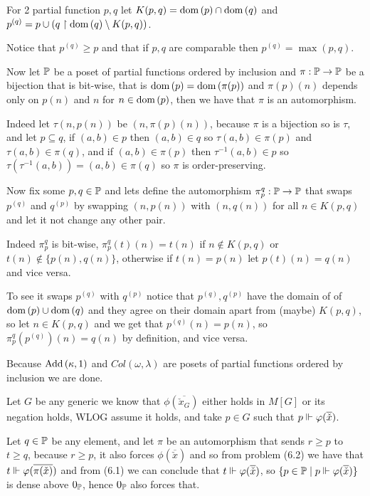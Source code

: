 \begin{cExercise}
	\begin{cPart}
		For 2 partial function $p,q$ let $K(p,q)=\dom{p}\cap \dom{q}$ and $p^{(q)}=p\cup (q\restriction \dom{q}\setminus K(p,q))$.
		
		Notice that $p^{(q)}\ge p$ and that if $p,q$ are comparable then $p^{(q)}=\max(p,q)$.
		
		Now let $\P$ be a poset of partial functions ordered by inclusion and $\pi:\P\to\P$ be a bijection that is bit-wise, that is $\dom{p}=\dom{\pi(p)}$ and $\pi(p)(n)$ depends only on $p(n)$ and $n$ for $n\in\dom{p}$, then we have that $\pi$ is an automorphism.
		
		Indeed let $\tau(n,p(n))$ be $(n,\pi(p)(n))$, because $\pi$ is a bijection so is $\tau$, and let $p\subseteq q$, if $(a,b)\in p$ then $(a,b)\in q$ so $\tau(a,b)\in \pi(p)$ and $\tau(a,b)\in \pi(q)$, and if $(a,b)\in \pi(p)$ then $\tau^{-1}(a,b)\in p$ so $\tau(\tau^{-1}(a,b))=(a,b)\in \pi(q)$ so $\pi$ is order-preserving.
		
		Now fix some $p,q\in\P$ and lets define the automorphism $\pi_p^q:\P\to\P$ that swaps $p^{(q)}$ and $q^{(p)}$ by swapping $(n,p(n))$ with $(n,q(n))$ for all $n\in K(p,q)$ and let it not change any other pair.
		
		Indeed $\pi_p^q$ is bit-wise, $\pi_p^q(t)(n)=t(n)$ if $n\notin K(p,q)$ or $t(n)\notin\{p(n),q(n)\}$, otherwise if $t(n)=p(n)$ let $p(t)(n)=q(n)$ and vice versa.
		
		To see it swaps $p^{(q)}$ with $q^{(p)}$ notice that $p^{(q)},q^{(p)}$ have the domain of of $\dom{p}\cup\dom{q}$ and they agree on their domain apart from (maybe) $K(p,q)$, so let $n\in K(p,q)$ and we get that $p^{(q)}(n)=p(n)$, so $\pi_p^q(p^{(q)})(n)=q(n)$ by definition, and vice versa.
		
		Because $\Add{\kappa}{1}$ and $Col(\omega,\lambda)$ are posets of partial functions ordered by inclusion we are done.
	\end{cPart}
	\begin{cPart}
		Let $G$ be any generic we know that $\phi(\overline{\check{x}_G})$ either holds in $M[G]$ or its negation holds, WLOG assume it holds, and take $p\in G$ such that $p\force \phi(\overline{\check{x}})$.
		
		Let $q\in\P$ be any element, and let $\pi$ be an automorphism that sends $r\ge p$ to $t\ge q$, because $r\ge p$, it also forces $\phi(\overline{\check{x}})$ and so from problem (6.2) we have that $t\force \phi(\overline{\pi(\check{x})})$ and from (6.1) we can conclude that $t\force \phi(\overline{\check{x}})$, so $\{p\in \P\mid p\force\phi(\overline{\check{x}})\}$ is dense above $0_\P$, hence $0_\P$ also forces that.
	\end{cPart}
\end{cExercise}







